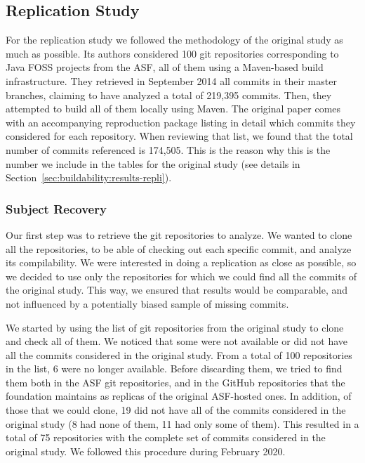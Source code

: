 
\subsection{Replication Study}

For the replication study we followed the methodology of the original study as much as possible. Its authors considered 100 git repositories corresponding to Java FOSS projects from the ASF, all of them using a Maven-based build infrastructure. They retrieved in September 2014 all commits in their master branches, claiming to have analyzed a total of 219,395 commits. Then, they attempted to build all of them locally using Maven. The original paper comes with an accompanying reproduction package listing in detail which commits they considered for each repository. When reviewing that list, we found that the total number of commits referenced is 174,505. This is the reason why this is the number we include in the tables for the original study (see details in Section~\ref{sec:buildability:results-repli}).

\subsubsection{Subject Recovery}

Our first step was to retrieve the git repositories to analyze. We wanted to clone all the repositories, to be able of checking out each specific commit, and analyze its compilability. We were interested in doing a replication as close as possible, so we decided to use only the repositories for which we could find all the commits of the original study. This way, we ensured that results would be comparable, and not influenced by a potentially biased sample of missing commits.

We started by using the list of git repositories from the original study to clone and check all of them. We noticed that some were not available or did not have all the commits considered in the original study. From a total of 100 repositories in the list, 6 were no longer available. Before discarding them, we tried to find them both in the ASF git repositories, and in the GitHub repositories that the foundation maintains as replicas of the original ASF-hosted ones. In addition, of those that we could clone, 19 did not have all of the commits considered in the original study (8 had none of them, 11 had only some of them). This resulted in a total of 75 repositories with the complete set of commits considered in the original study. We followed this procedure during February 2020.

